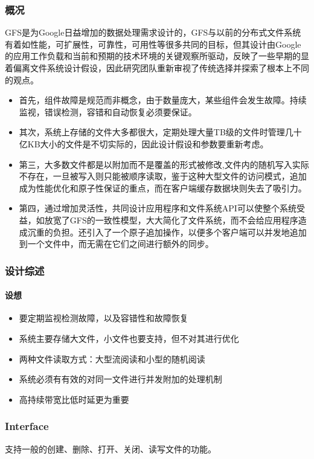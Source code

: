 \documentclass{ctexart}
\begin{document}
\subsubsection{概况}
GFS是为Google日益增加的数据处理需求设计的，GFS与以前的分布式文件系统有着如性能，可扩展性，可靠性，可用性等很多共同的目标，但其设计由Google的应用工作负载和当前和预期的技术环境的关键观察所驱动，反映了一些早期的显着偏离文件系统设计假设，因此研究团队重新审视了传统选择并探索了根本上不同的观点。
\begin{itemize}
	\item 首先，组件故障是规范而非概念，由于数量庞大，某些组件会发生故障。持续监视，错误检测，容错和自动恢复必须要保证。
	\item 其次，系统上存储的文件大多都很大，定期处理大量TB级的文件时管理几十亿KB大小的文件是不切实际的，因此设计假设和参数要重新考虑。
	\item 第三，大多数文件都是以附加而不是覆盖的形式被修改,文件内的随机写入实际不存在，一旦被写入则只能被顺序读取，鉴于这种大型文件的访问模式，追加成为性能优化和原子性保证的重点，而在客户端缓存数据块则失去了吸引力。
	\item 第四，通过增加灵活性，共同设计应用程序和文件系统API可以使整个系统受益，如放宽了GFS的一致性模型，大大简化了文件系统，而不会给应用程序造成沉重的负担。还引入了一个原子追加操作，以便多个客户端可以并发地追加到一个文件中，而无需在它们之间进行额外的同步。
\end{itemize}
\subsubsection{设计综述}
\paragraph{设想}
\begin{itemize}
	\item 要定期监视检测故障，以及容错性和故障恢复
	\item 系统主要存储大文件，小文件也要支持，但不对其进行优化
	\item 两种文件读取方式：大型流阅读和小型的随机阅读
	\item 系统必须有有效的对同一文件进行并发附加的处理机制
	\item 高持续带宽比低时延更为重要
\end{itemize}
\subsubsection{Interface}
支持一般的创建、删除、打开、关闭、读写文件的功能。
\end{document}
